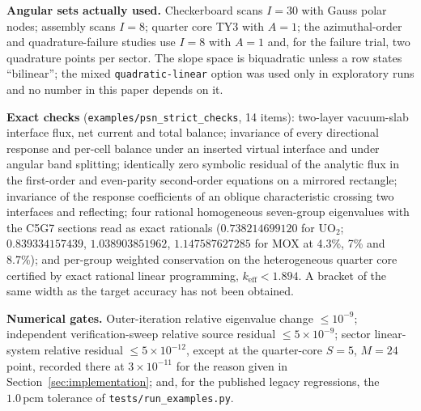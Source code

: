 \documentclass[11pt,a4paper]{article}
\newcommand{\pcm}{\,\mathrm{pcm}}
\begin{document}
\textbf{Angular sets actually used.} Checkerboard scans $I{=}30$ with Gauss polar
nodes; assembly scans $I{=}8$; quarter core TY3 with $A{=}1$; the azimuthal-order and
quadrature-failure studies use $I{=}8$ with $A{=}1$ and, for the failure trial, two
quadrature points per sector. The slope space is biquadratic unless a row states
``bilinear''; the mixed \texttt{quadratic-linear} option was used only in exploratory
runs and no number in this paper depends on it.

\textbf{Exact checks} (\texttt{examples/psn\_strict\_checks}, 14 items): two-layer
vacuum-slab interface flux, net current and total balance; invariance of every
directional response and per-cell balance under an inserted virtual interface and
under angular band splitting; identically zero symbolic residual of the analytic flux
in the first-order and even-parity second-order equations on a mirrored rectangle;
invariance of the response coefficients of an oblique characteristic crossing two
interfaces and reflecting; four rational homogeneous seven-group eigenvalues with the
C5G7 sections read as exact rationals ($0.738214699120$ for UO$_2$; $0.839334157439$,
$1.038903851962$, $1.147587627285$ for MOX at 4.3\%, 7\% and 8.7\%); and per-group
weighted conservation on the heterogeneous quarter core certified by exact rational
linear programming, $k_\mathrm{eff}<1.894$. A bracket of the same width as the target
accuracy has not been obtained.

\textbf{Numerical gates.} Outer-iteration relative eigenvalue change $\le10^{-9}$;
independent verification-sweep relative source residual $\le5\times10^{-9}$; sector
linear-system relative residual $\le5\times10^{-12}$, except at the quarter-core
$S{=}5$, $M{=}24$ point, recorded there at $3\times10^{-11}$ for the reason given in
Section~\ref{sec:implementation}; and, for the published legacy regressions, the
$1.0\pcm$ tolerance of \texttt{tests/run\_examples.py}.
\end{document}

